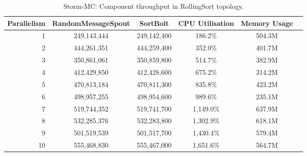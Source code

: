 \begin{table}[!htb]
\begin{adjustwidth}{-0.5in}{-0.5in}
\centering
\small
\begin{tabular}{@{}rccccl@{}}
    \textbf{Parallelism} & \textbf{RandomMessageSpout} & \textbf{SortBolt} & \textbf{CPU Utilisation} & \textbf{Memory Usage} \\ \toprule
    1 & {249,143,444} & {249,142,400} & {186.2\%} & {504.3M} \\
    2 & {444,261,351} & {444,259,400} & {352.0\%} & {401.7M} \\
    3 & {350,861,061} & {350,859,800} & {514.7\%} & {382.9M} \\
    4 & {412,429,850} & {412,428,600} & {675.2\%} & {314.2M} \\
    5 & {470,813,184} & {470,811,300} & {835.8\%} & {423.2M} \\
    6 & {498,957,255} & {498,954,600} & {989.6\%} & {235.1M} \\
    7 & {519,744,352} & {519,741,700} & {1,149.0\%} & {637.9M} \\
    8 & {532,285,376} & {532,283,800} & {1,302.9\%} & {618.1M} \\
    9 & {501,519,539} & {501,517,700} & {1,430.4\%} & {579.4M} \\
    10 & {555,468,830} & {555,467,000} & {1,651.6\%} & {564.7M} \\ 
\end{tabular}
\caption{Storm-MC: Component throughput in RollingSort topology.}
\label{table:storm_mc_rolling}
\end{adjustwidth}
\end{table}

